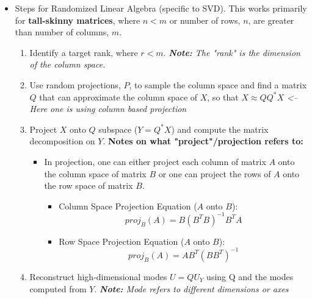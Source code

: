 \documentclass[11.5pt,a4paper]{article}
\begin{document}
\begin{itemize}
    \item Steps for Randomized Linear Algebra (specific to SVD). This works primarily for \textbf{tall-skinny matrices}, where $n < m$ or number of rows, $n$, are greater than number of columns, $m$.
    \begin{enumerate}
        \item Identify a target rank, where $r < m$. \newline
        \textit{\textbf{Note:} The "rank" is the dimension of the column space.}

        \item Use random projections, $P$, to sample the column space and find a matrix $Q$ that can approximate the column space of $X$, so that $X \approx QQ^*X$ \textit{<-- Here one is using column based projection}

        \item Project $X$ onto $Q$ subspace ($Y = Q^*X$) and compute the matrix decomposition on $Y$. \newline
        \textbf{Notes on what "project"/projection refers to:}
        \begin{itemize}
            \item In projection, one can either project each column of matrix $A$ onto the column space of matrix $B$ or one can project the rows of $A$ onto the row space of matrix $B$.
            \begin{itemize}
                \item Column Space Projection Equation ($A$ onto $B$):
                \begin{equation*}
                    proj_B(A) = B(B^TB)^{-1}B^TA                
                \end{equation*}
                \item Row Space Projection Equation ($A$ onto $B$):
                \begin{equation*}
                    proj_B(A) = AB^T(BB^T)^{-1}                
                \end{equation*}
            \end{itemize}
        \end{itemize}

        \item Reconstruct high-dimensional modes $U = QU_Y$ using Q and the modes computed from $Y$. \newline
        \textit{\textbf{Note:} Mode refers to different dimensions or axes}
    \end{enumerate}
\end{itemize}
\end{document}
